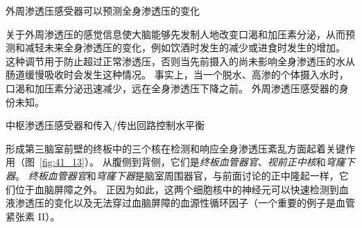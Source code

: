 外周渗透压感受器可以预测全身渗透压的变化

关于外周渗透压的感觉信息使大脑能够先发制人地改变口渴和加压素分泌，从而预测和减轻未来全身渗透压的变化，例如饮酒时发生的减少或进食时发生的增加。
这种调节用于防止超过正常渗透压，否则当先前摄入的尚未影响全身渗透压的水从肠道缓慢吸收时会发生这种情况。
事实上，当一个脱水、高渗的个体摄入水时，口渴和加压素分泌迅速减少，远在全身渗透压下降之前。
外周渗透压感受器的身份未知。


中枢渗透压感受器和传入/传出回路控制水平衡

形成第三脑室前壁的终板中的三个核在检测和响应全身渗透压紊乱方面起着关键作用（图~\ref{fig:41_13}）。
从腹侧到背侧，它们是\textit{终板血管器官}、\textit{视前正中核}和\textit{穹窿下器}。
\textit{终板血管器官}和\textit{穹窿下器}是脑室周围器官，与前面讨论的正中隆起一样，它们位于血脑屏障之外。
正因为如此，这两个细胞核中的神经元可以快速检测到血液渗透压的变化以及无法穿过血脑屏障的血源性循环因子（一个重要的例子是血管紧张素 II）。


